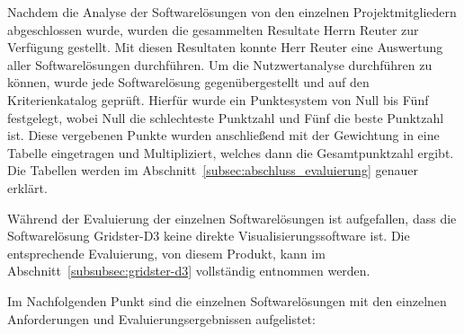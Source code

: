 Nachdem die Analyse der Softwarelösungen von den einzelnen Projektmitgliedern
abgeschlossen wurde, wurden die gesammelten Resultate Herrn Reuter zur
Verfügung gestellt. Mit diesen Resultaten konnte Herr Reuter eine Auswertung
aller Softwarelösungen durchführen. Um die Nutzwertanalyse durchführen zu
können, wurde jede Softwarelösung gegenübergestellt und auf den
Kriterienkatalog geprüft. Hierfür wurde ein Punktesystem von Null bis Fünf
festgelegt, wobei Null die schlechteste Punktzahl und Fünf die beste Punktzahl
ist. Diese vergebenen Punkte wurden anschließend mit der Gewichtung in eine
Tabelle eingetragen und Multipliziert, welches dann die Gesamtpunktzahl ergibt.
Die Tabellen werden im Abschnitt~\ref{subsec:abschluss_evaluierung} genauer
erklärt.

Während der Evaluierung der einzelnen Softwarelösungen ist aufgefallen, dass
die Softwarelösung Gridster\hyp{}D3 keine direkte Visualisierungssoftware
ist. Die entsprechende Evaluierung, von diesem Produkt, kann im
Abschnitt~\ref{subsubsec:gridster-d3} vollständig entnommen werden.

Im Nachfolgenden Punkt sind die einzelnen Softwarelösungen mit den einzelnen
Anforderungen und Evaluierungsergebnissen aufgelistet:
\mr%

